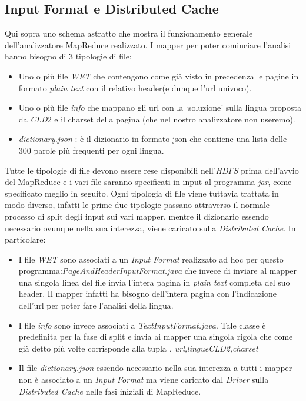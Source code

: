\documentclass{article}
\newcommand{\MR}{MapReduce}
\newcommand{\cld}{\textit{CLD}2}
\newcommand{\pt}{\textit{plain text}}
\newcommand{\filename}[1]{\textit{#1}}
\begin{document}
\subsection{Input Format e Distributed Cache}
Qui sopra uno schema astratto che mostra il funzionamento generale dell'analizzatore \MR{} realizzato. I mapper per poter cominciare l'analisi hanno bisogno di 3 tipologie di file: 
\begin{itemize}
    \item Uno o più file \textit{WET} che contengono come già visto in precedenza le pagine in formato \pt{} con il relativo header(e dunque l'url univoco).
    \item Uno o più file \textit{info} che mappano gli url con la `soluzione' sulla lingua proposta da \cld{} e il charset della pagina (che nel nostro analizzatore non useremo).
    \item \filename{dictionary.json} : è il dizionario in formato json che contiene una lista delle 300 parole più frequenti per ogni lingua.
\end{itemize}
Tutte le tipologie di file devono essere rese disponibili nell'\textit{HDFS} prima dell'avvio del \MR{} e i vari file saranno specificati in input al programma \textit{jar}, come specificato meglio in seguito. Ogni tipologia di file viene tuttavia trattata in modo diverso, infatti le prime due tipologie passano attraverso il normale processo di split degli input sui vari mapper, mentre il dizionario essendo necessario ovunque nella sua interezza, viene caricato sulla \textit{Distributed Cache}. In particolare:
\begin{itemize}
    \item I file \textit{WET} sono associati a un \textit{Input Format} realizzato ad hoc per questo programma:\filename{PageAndHeaderInputFormat.java} che invece di inviare al mapper una singola linea del file invia l'intera pagina in \pt{} completa del suo header. Il mapper infatti ha bisogno dell'intera pagina con l'indicazione dell'url per poter fare l'analisi della lingua.
    \item I file \textit{info} sono invece associati a \filename{TextInputFormat.java}. Tale classe è predefinita per la fase di split e invia ai mapper una singola rigola che come già detto più volte corrisponde alla tupla \textit{\textlangle. url,lingue\cld{},charset\textrangle}
    \item Il file \filename{dictionary.json} essendo necessario nella sua interezza a tutti i mapper non è associato a un \textit{Input Format} ma viene caricato dal \filename{Driver} sulla \textit{Distributed Cache} nelle fasi iniziali di \MR{}.
\end{itemize}
\end{document}
